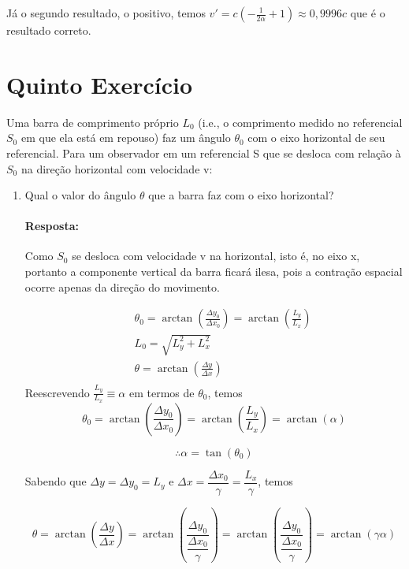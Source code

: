 \documentclass[10pt,a4paper]{article}
\begin{document}
	Já o segundo resultado, o positivo, temos
	$ v' = c\left(-\frac{1}{2\alpha} + 1\right) \approx 0,9996 c$ que é o resultado correto.


	\section{Quinto Exercício}
	Uma barra de comprimento próprio $ L_0 $ (i.e., o comprimento medido no referencial $ S_0 $ em que ela está em repouso) faz um ângulo $ \theta_0 $ com o eixo
	horizontal de seu referencial. Para um observador em um referencial S que se desloca com relação à $ S_0 $ na direção horizontal com velocidade v:
	\begin{enumerate}
		\item Qual o valor do ângulo $ \theta $ que a barra faz com o eixo horizontal?
		
		\paragraph{Resposta:}
		Como $ S_0 $ se desloca com velocidade v na horizontal, isto é, no eixo x, portanto a componente vertical da barra ficará ilesa, pois a contração espacial ocorre apenas da direção do movimento.
		
		\begin{eqnarray}
			&& \theta_0 = \arctan\left(\frac{\Delta y_0}{\Delta x_0}\right) = \arctan\left(\frac{L_y}{L_x}\right)\nonumber \\
			&& L_0 = \sqrt{L_y^2+L_x^2} \nonumber\\
			&& \theta = \arctan\left(\frac{\Delta y}{\Delta x}\right) \nonumber \\
		\end{eqnarray}
		 Reescrevendo $ \frac{L_y}{L_x} \equiv \alpha$ em termos de $ \theta_0 $, temos
		 $$\theta_0 = \arctan\left(\frac{\Delta y_0}{\Delta x_0}\right) = \arctan\left(\frac{L_y}{L_x}\right) =  \arctan (\alpha)$$
		 
		 $$\therefore \alpha = \tan (\theta_0)$$
		 
		 Sabendo que $ \Delta y = \Delta y_0 = L_y $ e $\Delta x = \dfrac{\Delta x_0}{\gamma} =\dfrac{L_x}{\gamma} $, temos
		 
		 $$ \theta = \arctan\left(\frac{\Delta y}{\Delta x}\right) = \arctan\left(\frac{\Delta y_0}{ \dfrac{\Delta x_0}{\gamma}}\right) =\arctan\left(\frac{\Delta y_0}{ \dfrac{\Delta x_0}{\gamma}}\right) = \arctan(\gamma\alpha)$$
		 

\end{enumerate}
\end{document}
